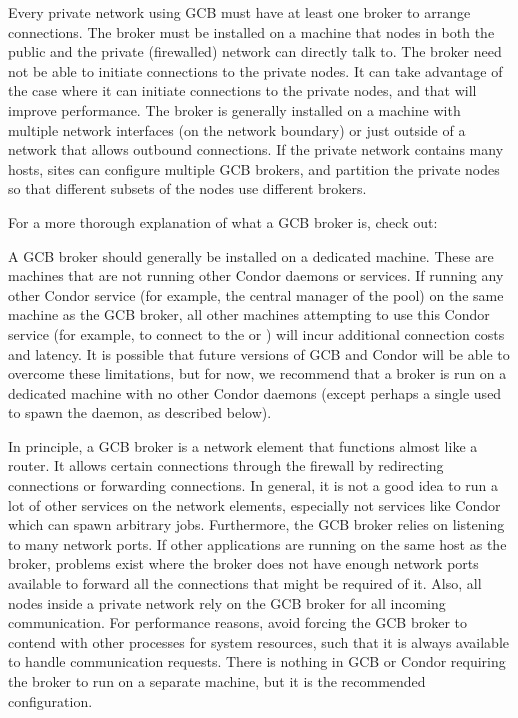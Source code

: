 Every private network using GCB
must have at least one broker to arrange connections.
The broker must be installed on a machine that nodes in both the
public and the private (firewalled) network can directly talk to.
The broker need not be able to initiate connections to the
private nodes.  
It can take advantage of the case where it can
initiate connections to the private nodes, and that will improve
performance. 
The broker is generally installed on a 
machine with multiple network interfaces
(on the network boundary) or just outside
of a network that allows outbound connections.
If the private network contains many hosts, sites can configure
multiple GCB brokers, and partition the private nodes so that different
subsets of the nodes use different brokers.

For a more thorough explanation of what a GCB broker is, check out:

A GCB broker should generally be installed on a dedicated machine.
These are machines that are not running other Condor daemons or services.
If running any other Condor service 
(for example, the central manager of the pool)
on the same machine as the GCB broker,
all other machines attempting
to use this Condor service
(for example, to connect to the  or )
will incur additional connection costs and latency.
It is possible that future versions of GCB and Condor will be able to
overcome these limitations, but for now, we recommend that a broker
is run on a dedicated machine with no other Condor daemons (except
perhaps a single  used to spawn the 
daemon, as described below).

In principle, a GCB broker is a network element that functions almost
like a router.
It allows certain connections through the firewall by redirecting
connections or forwarding connections.
In general, it is not a good idea to run a lot of other services on
the network elements, especially not services like Condor which can
spawn arbitrary jobs.
Furthermore, the GCB broker relies on listening to many network
ports.
If other applications are running on the same host as the broker,
problems exist
where the broker does not have enough network
ports available to forward all the connections that might be required
of it.
Also, all nodes inside a private network rely on the GCB broker for
all incoming communication.
For performance reasons, avoid forcing the GCB broker to
contend with other processes for system resources, such that it is always
available to handle communication requests.
There is nothing in GCB or Condor requiring
the broker to run on a separate machine, 
but it is the recommended configuration.

